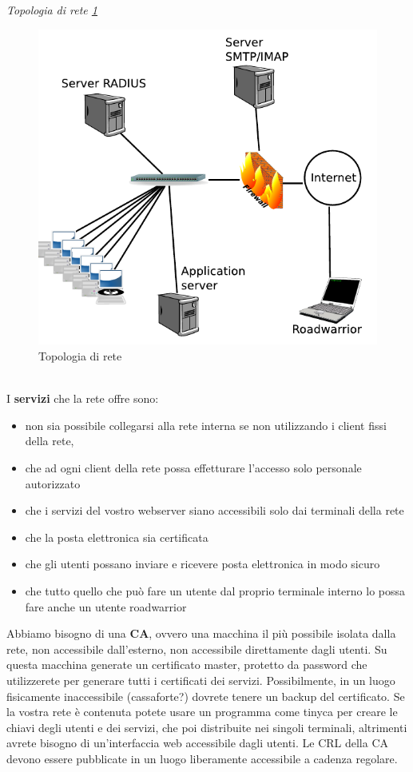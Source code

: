 \documentclass[12pt]{article}
\begin{document}
			\textit{Topologia di rete \ref{fig:22}}\\
			\begin{figure}[h!]
				\centering
				\includegraphics[scale=0.60]{img/rete.PNG}
				\caption{Topologia di rete \label{fig:22}}
			\end{figure}\\
		
			I \textbf{servizi} che la rete offre sono:
			\begin{itemize}
				\item non sia possibile collegarsi alla rete interna se non utilizzando i client fissi
				della rete,
				\item che ad ogni client della rete possa effetturare l’accesso solo personale
				autorizzato
				\item che i servizi del vostro webserver siano accessibili solo dai terminali della
				rete
				\item che la posta elettronica sia certificata
				\item che gli utenti possano inviare e ricevere posta elettronica in modo sicuro
				\item che tutto quello che può fare un utente dal proprio terminale interno lo
				possa fare anche un utente roadwarrior
			\end{itemize} 
			Abbiamo bisogno di una \textbf{CA}, ovvero una macchina il più possibile isolata dalla rete, non accessibile
			dall’esterno, non accessibile direttamente dagli utenti.
			Su questa macchina generate un certificato master, protetto da password
			che utilizzerete per generare tutti i certificati dei servizi. Possibilmente, in
			un luogo fisicamente inaccessibile (cassaforte?) dovrete tenere un
			backup del certificato.
			Se la vostra rete è contenuta potete usare un programma come tinyca
			per creare le chiavi degli utenti e dei servizi, che poi distribuite nei singoli
			terminali, altrimenti avrete bisogno di un’interfaccia web accessibile dagli
			utenti.
			Le CRL della CA devono essere pubblicate in un luogo liberamente
			accessibile a cadenza regolare.
			
\end{document}

